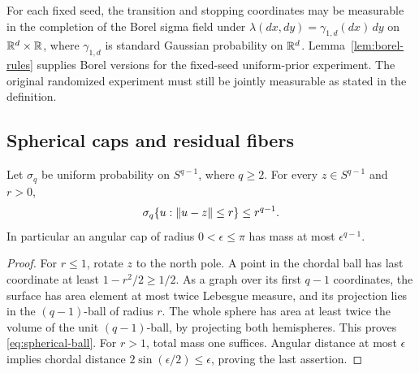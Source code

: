 For each fixed seed, the transition and stopping coordinates may be
measurable in the completion of the Borel sigma field under
$\lambda(dx,dy)=\gamma_{1,d}(dx)\,dy$ on $\mathbb R^d\times\mathbb R$, where
$\gamma_{1,d}$ is standard Gaussian probability on $\mathbb R^d$.
Lemma~\ref{lem:borel-rules} supplies Borel versions for the fixed-seed
uniform-prior experiment. The original randomized experiment must still
be jointly measurable as stated in the definition.

\subsection{Spherical caps and residual fibers}

\begin{lemma}\label{lem:spherical-ball}
Let $\sigma_q$ be uniform probability on $S^{q-1}$, where $q\ge2$.
For every $z\in S^{q-1}$ and $r>0$,
\begin{equation}\label{eq:spherical-ball}
 \sigma_q\{u:\lVert u-z\rVert\le r\}\le r^{q-1}.
\end{equation}
In particular an angular cap of radius $0<\epsilon\le\pi$ has mass at most
$\epsilon^{q-1}$.
\end{lemma}

\begin{proof}
For $r\le1$, rotate $z$ to the north pole. A point in the chordal ball has
last coordinate at least $1-r^2/2\ge1/2$. As a graph over its first $q-1$
coordinates, the surface has area element at most twice Lebesgue measure,
and its projection lies in the $(q-1)$-ball of radius $r$. The whole sphere
has area at least twice the volume of the unit $(q-1)$-ball, by projecting
both hemispheres. This proves \eqref{eq:spherical-ball}. For $r>1$, total
mass one suffices. Angular distance at most $\epsilon$ implies chordal
distance $2\sin(\epsilon/2)\le\epsilon$, proving the last assertion.
\end{proof}


